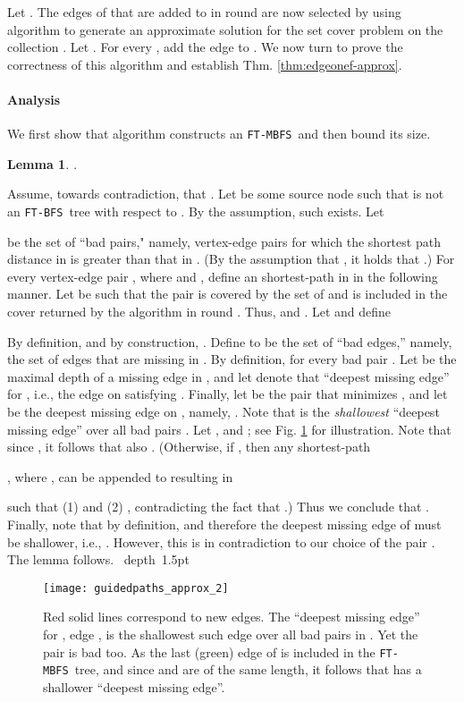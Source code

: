 \documentclass[12pt]{article}
\newtheorem{lemma}[theorem]{Lemma}
\def\Proof{\par\noindent{\bf Proof:~}}
\def\blackslug{\hbox{\hskip 1pt \vrule width 4pt height 8pt
    depth 1.5pt \hskip 1pt}}
\def\QED{\quad\blackslug\lower 8.5pt\null\par}
\def\FTMBFS{\mbox{\tt FT-MBFS}}
\def\FTBFS{\mbox{\tt FT-BFS}}
\begin{document}
Let .
The edges of  that are added to  in round  are now selected by using algorithm  to generate an approximate solution for the set cover problem on the collection .
Let .
For every , add the edge
 to .
We now turn to prove the correctness of this algorithm
and establish Thm. \ref{thm:edgeonef-approx}.

\paragraph{Analysis}
We first show that algorithm constructs an \FTMBFS\
 and then bound its size.
\begin{lemma}
\label{lem:correct}
.
\end{lemma}
\Proof
Assume, towards contradiction, that .
Let  be some source node such that  is not an \FTBFS\ tree with respect to . By the assumption, such  exists. Let

be the set of ``bad pairs," namely, vertex-edge pairs  for which the  shortest path distance in  is greater than that in .
(By the assumption that , it holds that .)
For every vertex-edge pair , where  and ,
define an  shortest-path  in  in the following manner.
Let  be such that the pair 
is covered by the set  of  and  is included in the cover returned by the algorithm  in round . Thus,  and
.
Let  and define

By definition,  and by construction, .
Define
 to be the set of ``bad edges,''
namely, the set of  edges that are missing in .
By definition,  for every bad pair .
Let  be the maximal depth
of a missing edge in , and let  denote that ``deepest
missing edge'' for , i.e., the edge  on  satisfying
.
Finally, let  be the pair that minimizes ,
and let  be
the deepest missing edge on , namely, .
Note that  is the {\em shallowest} ``deepest missing edge''
over all bad pairs .
Let ,  and
;
see Fig. \ref{fig:guidedpaths} for illustration.
Note that since , it follows that also .
(Otherwise, if , then any  shortest-path

, where , can be appended to  resulting in

such that (1)  and (2)
, contradicting the fact that
.)
Thus we conclude that .
Finally, note that  by definition, and therefore
the deepest missing edge of  must be shallower, i.e.,
. However, this is in contradiction to our choice
of the pair . The lemma follows.
\QED

\begin{figure}[htb!]
\begin{center}
\texttt{[image: guidedpaths\_approx\_2]}
\caption{\label{fig:guidedpaths}
Red solid lines correspond to new edges.
The ``deepest missing edge'' for , edge , is the shallowest
such edge over all bad pairs in . Yet the pair  is bad too.
As the last (green) edge of  is included in the \FTMBFS\ tree,
and since  and  are of the same length, it follows that 
has a shallower ``deepest missing edge''.}
\end{center}
\end{figure}
\end{document}

